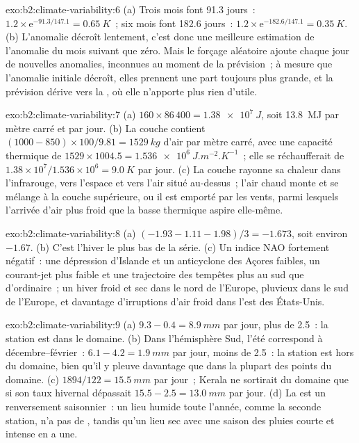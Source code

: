 \begin{solution}{exo:b2:climate-variability:6}
(a) Trois mois font 91.3 jours~: $1.2 \times \mathrm{e}^{-91.3/147.1} = \qty{0.65}{K}$~; six mois font
182.6 jours~: $1.2 \times \mathrm{e}^{-182.6/147.1} = \qty{0.35}{K}$. (b) L'anomalie décroît
lentement, c'est donc une meilleure estimation de l'anomalie du mois suivant que zéro. Mais le forçage aléatoire ajoute
chaque jour de nouvelles anomalies, inconnues au moment de la prévision~; à mesure que l'anomalie initiale décroît,
elles prennent une part toujours plus grande, et la prévision dérive vers la , où elle n'apporte plus rien
d'utile.
\end{solution}

\begin{solution}{exo:b2:climate-variability:7}
(a) $160 \times 86\,400 = \qty{1.38e7}{J}$, soit \qty{13.8}{MJ} par mètre carré et par jour. (b) La
couche contient $(1000 - 850) \times 100/9.81 = \qty{1529}{kg}$ d'air par mètre carré, avec une capacité
thermique de $1529 \times 1004.5 = \qty{1.536e6}{J.m^{-2}.K^{-1}}$~; elle se réchaufferait de $1.38 \times
10^7/1.536 \times 10^6 = \qty{9.0}{K}$ par jour. (c) La couche rayonne sa chaleur dans l'infrarouge, vers l'espace et vers
l'air situé au-dessus~; l'air chaud monte et se mélange à la couche supérieure, ou il est emporté par les vents,
parmi lesquels l'arrivée d'air plus froid que la basse thermique aspire elle-même.
\end{solution}

\begin{solution}{exo:b2:climate-variability:8}
(a) $(-1.93 - 1.11 - 1.98)/3 = -1.673$, soit environ $-1.67$. (b) C'est l'hiver le plus bas de la série.
(c) Un indice NAO fortement négatif~: une dépression d'Islande et un anticyclone des Açores faibles, un courant-jet plus faible
et une trajectoire des tempêtes plus au sud que d'ordinaire~; un hiver froid et sec dans le nord de l'Europe, pluvieux dans le sud de l'Europe,
et davantage d'irruptions d'air froid dans l'est des États-Unis.
\end{solution}

\begin{solution}{exo:b2:climate-variability:9}
(a) $9.3 - 0.4 = \qty{8.9}{mm}$ par jour, plus de 2.5~: la station est dans le domaine. (b) Dans l'hémisphère Sud, l'été
correspond à décembre--février~: $6.1 - 4.2 = \qty{1.9}{mm}$ par jour, moins de 2.5~: la station est hors du domaine,
bien qu'il y pleuve davantage que dans la plupart des points du domaine. (c) $1894/122 = \qty{15.5}{mm}$ par
jour~; Kerala ne sortirait du domaine que si son taux hivernal dépassait $15.5 - 2.5 = \qty{13.0}{mm}$ par jour.
(d) La  est un renversement saisonnier~: un lieu humide toute l'année, comme la seconde station, n'a pas de
, tandis qu'un lieu sec avec une saison des pluies courte et intense en a une.
\end{solution}


